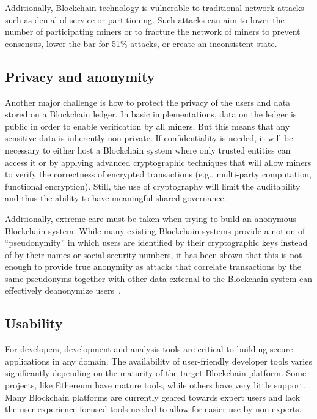 Additionally, Blockchain technology is vulnerable to traditional network attacks such as denial of service or partitioning.  Such attacks can aim to lower the number of participating miners or to fracture the network of miners to prevent consensus, lower the bar for 51\% attacks, or create an inconsistent state.

\subsection{Privacy and anonymity}
Another major challenge is how to protect the privacy of the users and data stored on a Blockchain ledger.  In basic implementations, data on the ledger is public in order to enable verification by all miners.  But this means that any sensitive data is inherently non-private. If confidentiality is needed, it will be necessary to either host a Blockchain system where only trusted entities can access it or by applying advanced cryptographic techniques that will allow miners to verify the correctness of encrypted transactions (e.g., multi-party computation, functional encryption). Still, the use of cryptography will limit the auditability and thus the ability to have meaningful shared governance.

Additionally, extreme care must be taken when trying to build an anonymous Blockchain system.
While many existing Blockchain systems provide a notion of ``pseudonymity'' in which users are identified by their cryptographic keys instead of by their names or social security numbers, it has been shown that this is not enough to provide true anonymity as attacks that correlate transactions by the same pseudonyms together with other data external to the Blockchain system can effectively deanonymize users~\cite{DBLP:journals/corr/abs-1708-04748}.

\subsection{Usability} %
For developers, development and analysis tools are critical to building secure applications in any domain. The availability of user-friendly developer tools varies significantly depending on the maturity of the target Blockchain platform. Some projects, like Ethereum have mature tools, while others have very little support. Many Blockchain platforms are currently geared towards expert users and lack the user experience-focused tools needed to allow for easier use by non-experts.

